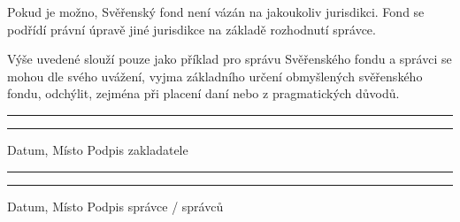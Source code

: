 \documentclass[parskip=half]{scrreprt}
\begin{document}
\begin{contract}

Pokud je možno, Svěřenský fond není vázán na jakoukoliv jurisdikci. Fond se podřídí právní úpravě jiné jurisdikce na základě rozhodnutí správce.

Výše uvedené slouží pouze jako příklad pro správu Svěřenského fondu a správci se mohou dle svého uvážení, vyjma základního určení obmyšlených svěřenského fondu, odchýlit, zejména při placení daní nebo z pragmatických důvodů.
	
\end{contract}
\newpage

\vspace{50pt} 
\noindent\rule{7cm}{.4pt}\hfill\rule{7cm}{.4pt}\par 
\noindent Datum, Místo \hfill Podpis zakladatele

\vspace{50pt} 
\noindent\rule{7cm}{.4pt}\hfill\rule{7cm}{.4pt}\par 
\noindent Datum, Místo \hfill Podpis správce / správců
\end{document}
